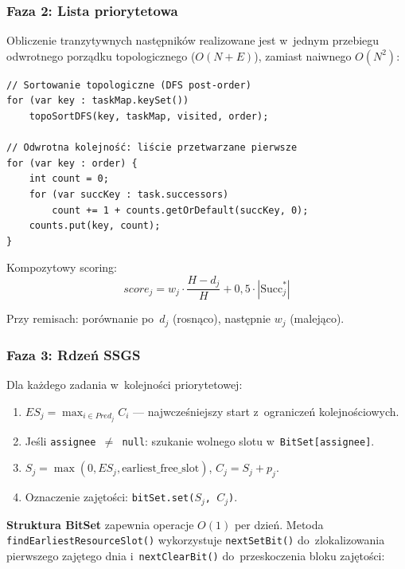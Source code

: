 \subsubsection{Faza 2: Lista priorytetowa}

Obliczenie tranzytywnych następników realizowane jest w~jednym przebiegu odwrotnego porządku topologicznego ($O(N + E)$), zamiast naiwnego $O(N^2)$:

\begin{verbatim}
// Sortowanie topologiczne (DFS post-order)
for (var key : taskMap.keySet())
    topoSortDFS(key, taskMap, visited, order);

// Odwrotna kolejność: liście przetwarzane pierwsze
for (var key : order) {
    int count = 0;
    for (var succKey : task.successors)
        count += 1 + counts.getOrDefault(succKey, 0);
    counts.put(key, count);
}
\end{verbatim}

Kompozytowy scoring:
\begin{equation}
score_j = w_j \cdot \frac{H - d_j}{H} + 0{,}5 \cdot |\text{Succ}_j^*|
\end{equation}

Przy remisach: porównanie po~$d_j$ (rosnąco), następnie $w_j$ (malejąco).

\subsubsection{Faza 3: Rdzeń SSGS}

Dla każdego zadania w~kolejności priorytetowej:

\begin{enumerate}
    \item $ES_j = \max_{i \in Pred_j} C_i$ --- najwcześniejszy start z~ograniczeń kolejnościowych.
    \item Jeśli \texttt{assignee $\neq$ null}: szukanie wolnego slotu w~\texttt{BitSet[assignee]}.
    \item $S_j = \max(0, ES_j, \text{earliest\_free\_slot})$, $C_j = S_j + p_j$.
    \item Oznaczenie zajętości: \texttt{bitSet.set($S_j$, $C_j$)}.
\end{enumerate}

\textbf{Struktura BitSet} zapewnia operacje $O(1)$ per dzień. Metoda \texttt{findEarliestResourceSlot()} wykorzystuje \texttt{nextSetBit()} do~zlokalizowania pierwszego zajętego dnia i~\texttt{nextClearBit()} do~przeskoczenia bloku zajętości:

